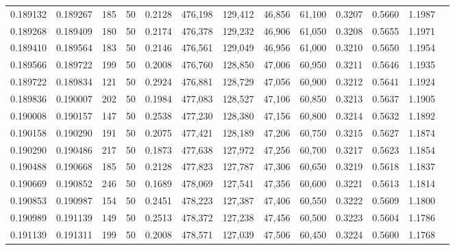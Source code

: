 \begin{tabular}{rrrrrrrrrrrrr}
0.189132 & 0.189267 &   185 &  50 &                                     0.2128 & 476,198 & 129,412 &  46,856 &  61,100 & 0.3207 & 0.5660 & 1.1987 \\
0.189268 & 0.189409 &   180 &  50 &                                     0.2174 & 476,378 & 129,232 &  46,906 &  61,050 & 0.3208 & 0.5655 & 1.1971 \\
0.189410 & 0.189564 &   183 &  50 &                                     0.2146 & 476,561 & 129,049 &  46,956 &  61,000 & 0.3210 & 0.5650 & 1.1954 \\
0.189566 & 0.189722 &   199 &  50 &                                     0.2008 & 476,760 & 128,850 &  47,006 &  60,950 & 0.3211 & 0.5646 & 1.1935 \\
0.189722 & 0.189834 &   121 &  50 &                                     0.2924 & 476,881 & 128,729 &  47,056 &  60,900 & 0.3212 & 0.5641 & 1.1924 \\
0.189836 & 0.190007 &   202 &  50 &                                     0.1984 & 477,083 & 128,527 &  47,106 &  60,850 & 0.3213 & 0.5637 & 1.1905 \\
0.190008 & 0.190157 &   147 &  50 &                                     0.2538 & 477,230 & 128,380 &  47,156 &  60,800 & 0.3214 & 0.5632 & 1.1892 \\
0.190158 & 0.190290 &   191 &  50 &                                     0.2075 & 477,421 & 128,189 &  47,206 &  60,750 & 0.3215 & 0.5627 & 1.1874 \\
0.190290 & 0.190486 &   217 &  50 &                                     0.1873 & 477,638 & 127,972 &  47,256 &  60,700 & 0.3217 & 0.5623 & 1.1854 \\
0.190488 & 0.190668 &   185 &  50 &                                     0.2128 & 477,823 & 127,787 &  47,306 &  60,650 & 0.3219 & 0.5618 & 1.1837 \\
0.190669 & 0.190852 &   246 &  50 &                                     0.1689 & 478,069 & 127,541 &  47,356 &  60,600 & 0.3221 & 0.5613 & 1.1814 \\
0.190853 & 0.190987 &   154 &  50 &                                     0.2451 & 478,223 & 127,387 &  47,406 &  60,550 & 0.3222 & 0.5609 & 1.1800 \\
0.190989 & 0.191139 &   149 &  50 &                                     0.2513 & 478,372 & 127,238 &  47,456 &  60,500 & 0.3223 & 0.5604 & 1.1786 \\
0.191139 & 0.191311 &   199 &  50 &                                     0.2008 & 478,571 & 127,039 &  47,506 &  60,450 & 0.3224 & 0.5600 & 1.1768 \\

\end{tabular}
